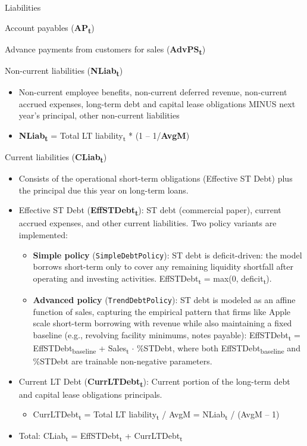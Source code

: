 \documentclass[12pt,a4paper]{article}
\begin{document}
Liabilities

Account payables (\textbf{AP\textsubscript{t}})

Advance payments from customers for sales
(\textbf{AdvPS\textsubscript{t}})

Non-current liabilities (\textbf{NLiab\textsubscript{t}})

\begin{itemize}
\item
  Non-current employee benefits, non-current deferred revenue,
  non-current accrued expenses, long-term debt and capital lease
  obligations MINUS next year's principal, other non-current liabilities
\item
  \textbf{NLiab\textsubscript{t}} = Total LT liability\textsubscript{t}
  * (1 -- 1/\textbf{AvgM})
\end{itemize}

Current liabilities (\textbf{CLiab\textsubscript{t}})

\begin{itemize}
\item
  Consists of the operational short-term obligations (Effective ST Debt)
  plus the principal due this year on long-term loans.
\item
  Effective ST Debt (\textbf{EffSTDebt\textsubscript{t}}): ST debt
  (commercial paper), current accrued expenses, and other current
  liabilities. Two policy variants are implemented:

  \begin{itemize}
  \item
    \textbf{Simple policy} (\texttt{SimpleDebtPolicy}): ST debt is
    deficit-driven: the model borrows short-term only to cover any
    remaining liquidity shortfall after operating and investing
    activities. EffSTDebt\textsubscript{t} = max(0,
    deficit\textsubscript{t}).
  \item
    \textbf{Advanced policy} (\texttt{TrendDebtPolicy}): ST debt is
    modeled as an affine function of sales, capturing the empirical
    pattern that firms like Apple scale short-term borrowing with
    revenue while also maintaining a fixed baseline (e.g., revolving
    facility minimums, notes payable):
    EffSTDebt\textsubscript{t} = EffSTDebt\textsubscript{baseline} +
    Sales\textsubscript{t} $\cdot$ \%STDebt, where both
    EffSTDebt\textsubscript{baseline} and \%STDebt are trainable
    non-negative parameters.
  \end{itemize}
\item
  Current LT Debt (\textbf{CurrLTDebt\textsubscript{t}}): Current
  portion of the long-term debt and capital lease obligations
  principals.

  \begin{itemize}
  \item
    CurrLTDebt\textsubscript{t} = Total LT liability\textsubscript{t} /
    AvgM = NLiab\textsubscript{t} / (AvgM -- 1)
  \end{itemize}
\item
  Total: CLiab\textsubscript{t} =
  EffSTDebt\textsubscript{t} + CurrLTDebt\textsubscript{t}
\end{itemize}
\end{document}
